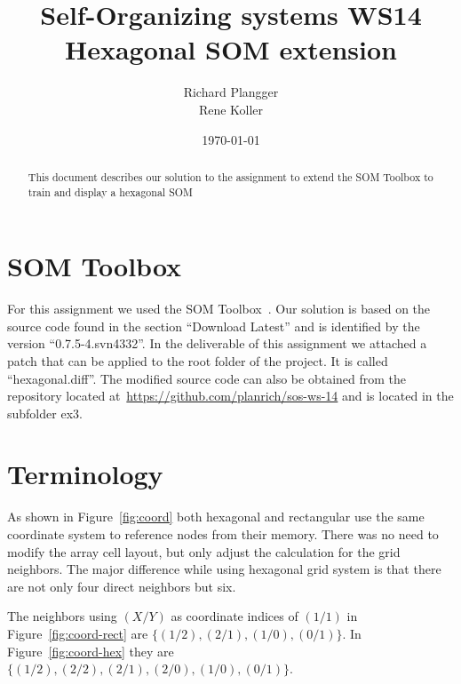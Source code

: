 \documentclass{acm_proc_article-sp}
\begin{document}
\title{Self-Organizing systems WS14\\
       Hexagonal SOM extension}

\author{
Richard Plangger\\
\alignauthor
Rene Koller\\
\alignauthor
}

\date{\today}

\maketitle

\begin{abstract}
    This document describes our solution to the assignment
    to extend the SOM Toolbox to train and display a hexagonal
    SOM
\end{abstract}


\section{SOM Toolbox}

For this assignment we used the SOM Toolbox~\cite{somtoolbox}. Our solution
is based on the source code found in the section ``Download Latest'' and is
identified by the version ``0.7.5-4.svn4332''. In the deliverable of this assignment we attached a patch that can be applied to the root folder of the project. It is called ``hexagonal.diff''. The modified source code can also be obtained from the repository located at~\url{https://github.com/planrich/sos-ws-14} and is located in the subfolder ex3.

\section{Terminology}

As shown in Figure~\ref{fig:coord} both hexagonal and rectangular
use the same coordinate system to reference nodes from their memory.
There was no need to modify the array cell layout, but only adjust the
calculation for the grid neighbors. The major
difference while using hexagonal grid system is that there are not only
four direct neighbors but six.

The neighbors using $(X/Y)$ as coordinate indices of $(1/1)$ in Figure~\ref{fig:coord-rect}
are $\{(1/2),(2/1),(1/0),(0/1)\}$. In Figure~\ref{fig:coord-hex} they are $\{(1/2),(2/2),(2/1),(2/0),(1/0),(0/1)\}$.
\end{document}
